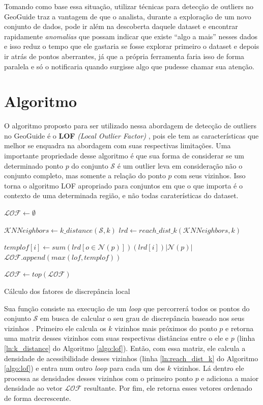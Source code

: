 Tomando como base essa situação, utilizar técnicas para detecção de outliers no GeoGuide traz a vantagem de que o analista, durante a exploração de um novo conjunto de dados, pode ir além na descoberta daquele dataset e encontrar rapidamente \textit{anomalias} que possam indicar que existe ``algo a mais'' nesses dados e isso reduz o tempo que ele gastaria se fosse explorar primeiro o dataset e depois ir atrás de pontos aberrantes, já que a própria ferramenta faria isso de forma paralela e só o notificaria quando surgisse algo que pudesse chamar sua atenção.

\section{Algoritmo}

O algoritmo proposto para ser utilizado nessa abordagem de detecção de outliers no GeoGuide \cite{omidvarTehrani2017} é o \textbf{LOF} \textit{(Local Outlier Factor)} \cite{Breunig:2000:LID:335191.335388}, pois ele tem as características que melhor se enquadra na abordagem com suas respectivas limitações. Uma importante propriedade desse algoritmo é que sua forma de considerar se um determinado ponto $p$ do conjunto $\mathcal{S}$ é um outlier leva em consideração não o conjunto completo, mas somente a relação do ponto $p$ com seus vizinhos. Isso torna o algoritmo LOF apropriado para conjuntos em que o que importa é o contexto de uma determinada região, e não todas caraterísticas do dataset.

\begin{algorithm}[!h]
	\DontPrintSemicolon
	$\mathcal{LOF} \gets \emptyset$\;
	{
		$\mathcal{K}NNeighbors \gets \mathit{k\_distance}(\mathcal{S}, k)$\label{ln:k_distance}\;
		$lrd \gets \mathit{reach\_dist\_k}(\mathcal{K}NNeighbors, k)$\label{ln:reach_dist_k}\;

		{
			$templof[i] \gets sum(lrd[o \in \mathcal{N} (p)])(lrd[i])|\mathcal{N}(p)|$\;
			$\mathcal{LOF}.append(max(lof, templof))$\;
		}
	}
	$\mathcal{LOF} \gets top(\mathcal{LOF})$\;
	\;  
	\caption{Cálculo dos fatores de discrepância local}
	\label{algo:lof}
\end{algorithm}

Sua função consiste na execução de um \textit{loop} que percorrerá todos os pontos do conjunto $\mathcal{S}$ em busca de calcular o seu grau de discrepância baseado nos seus vizinhos \cite{DBLP:conf:AlshawabkehJK10}. Primeiro ele calcula os $k$ vizinhos mais próximos do ponto $p$ e retorna uma matriz desses vizinhos com suas respectivas distâncias entre o ele e $p$ (linha \ref{ln:k_distance} do Algoritmo \ref{algo:lof}). Então, com essa matriz, ele calcula a densidade de acessibilidade desses vizinhos (linha \ref{ln:reach_dist_k} do Algoritmo \ref{algo:lof}) e entra num outro \textit{loop} para cada um dos $k$ vizinhos. Lá dentro ele processa as densidades desses vizinhos com o primeiro ponto $p$ e adiciona a maior densidade ao vetor $\mathcal{LOF}$ resultante. Por fim, ele retorna esses vetores ordenado de forma decrescente. 

